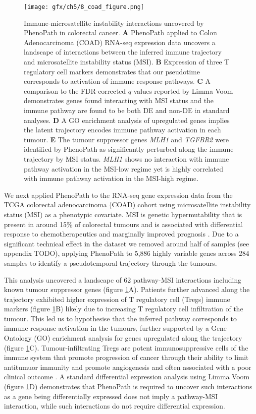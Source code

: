 \begin{figure}
\texttt{[image: gfx/ch5/8\_coad\_figure.png]}
\caption{Immune-microsatellite instability interactions uncovered by PhenoPath in colorectal cancer.
\textbf{A} PhenoPath applied to Colon Adenocarcinoma (COAD) RNA-seq expression data uncovers a landscape of interactions between the inferred immune trajectory and microsatellite instability status (MSI).
\textbf{B} Expression of three T regulatory cell markers demonstrates that our pseudotime corresponds to activation of immune response pathways.
\textbf{C} A comparison to the FDR-corrected $q$-values reported by Limma Voom demonstrates genes found interacting with MSI status and the immune pathway are found to be both DE and non-DE in standard analyses.
\textbf{D} A GO enrichment analysis of upregulated genes implies the latent trajectory encodes immune pathway activation in each tumour.
\textbf{E} The tumour suppressor genes \emph{MLH1} and \emph{TGFBR2} were identified by PhenoPath as significantly perturbed along the immune trajectory by MSI status. \emph{MLH1} shows no interaction with immune pathway activation in the MSI-low regime yet is highly correlated with immune pathway activation in the MSI-high regime.}
\label{fig:coad}
\end{figure}



We next applied PhenoPath to the RNA-seq gene expression data from the TCGA colorectal adenocarcinoma (COAD) cohort \cite{cancer2012comprehensive} using microsatellite instability status (MSI) as a phenotypic covariate. MSI is genetic hypermutability that is present in around 15\% of colorectal tumours and is associated with differential response to chemotherapeutics and marginally improved prognosis \cite{Boland2010-mz}. Due to a significant technical effect in the dataset we removed around half of samples (see appendix TODO), applying PhenoPath to 5,886 highly variable genes across 284 samples to identify a pseudotemporal trajectory through the tumours.

This analysis uncovered a landscape of 62 pathway-MSI interactions including known tumour suppressor genes (figure \ref{fig:coad}A).
Patients further advanced along the trajectory exhibited higher expression of T regulatory cell (Tregs) immune markers (figure \ref{fig:coad}B) likely due to increasing T regulatory cell infiltration of the tumour.
This led us to hypothesise that the inferred pathway corresponds to immune response activation in the tumours, further supported by a Gene Ontology (GO) enrichment analysis for genes upregulated along the trajectory   (figure \ref{fig:coad}C).
Tumour-infiltrating Tregs are potent immunosuppressive cells of the immune system that promote progression of cancer through their ability to limit antitumuor immunity and promote angiogenesis and often associated with a poor clinical outcome \cite{facciabene2012t}.
A standard differential expression analysis using Limma Voom \cite{Law2014-tu} (figure \ref{fig:coad}D) demonstrates that PhenoPath is required to uncover such interactions as a gene being differentially expressed does not imply a pathway-MSI interaction, while such interactions do not require differential expression.

